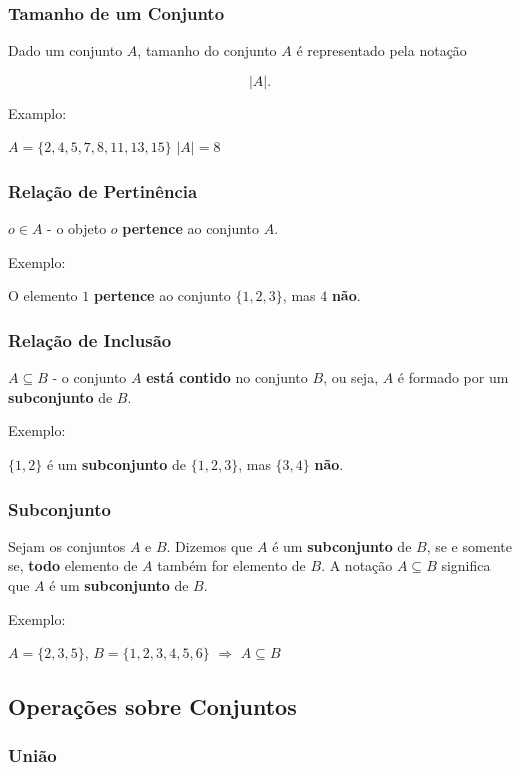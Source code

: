 \subsubsection{Tamanho de um Conjunto}

Dado um conjunto \(A\), tamanho do conjunto \(A\) é representado pela
notação

\[|A|.\]

Examplo:

\(A=\{2,4,5,7,8,11,13,15\}\) \(|A|=8\)

\subsubsection{Relação de
Pertinência}

\(o \in A\) - o objeto \(o\) \textbf{pertence} ao conjunto \(A\).

Exemplo:

O elemento \(1\) \textbf{pertence} ao conjunto \(\{1,2,3\}\), mas \(4\)
\textbf{não}.


\subsubsection{Relação de Inclusão}

\(A\subseteq B\) - o conjunto \(A\) \textbf{está contido} no conjunto
\(B\), ou seja, \(A\) é formado por um \textbf{subconjunto} de \(B\).

Exemplo:

\(\{1,2\}\) é um \textbf{subconjunto} de \(\{1,2,3\}\), mas \(\{3,4\}\)
\textbf{não}.

\subsubsection{Subconjunto}

Sejam os conjuntos \(A\) e \(B\). Dizemos que \(A\) é um
\textbf{subconjunto} de \(B\), se e somente se, \textbf{todo} elemento
de \(A\) também for elemento de \(B\). A notação \(A\subseteq B\)
significa que \(A\) é um \textbf{subconjunto} de \(B\).

Exemplo:

\(A=\{2,3,5\}\), \(B=\{1,2,3,4,5,6\}\) \(\Rightarrow\) \(A \subseteq B\)

\subsection{Operações sobre
Conjuntos}

\subsubsection{União}


